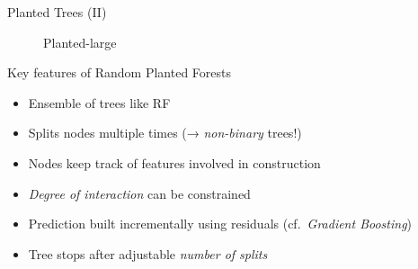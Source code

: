 \documentclass[aspectratio=169,12pt]{beamer}
\providecommand{\tightlist}{%
  \setlength{\itemsep}{2pt}\setlength{\parskip}{0pt}}
\begin{document}
\begin{frame}{Planted Trees (II)}
\label{planted-trees-ii}
\begin{figure}


\caption{\label{fig-planted}Planted-large}

\end{figure}%
\end{frame}

\begin{frame}{Key features of Random Planted Forests}
\label{key-features-of-random-planted-forests}
\begin{itemize}[<+->]
\tightlist
\item
  Ensemble of trees like RF
\item
  Splits nodes multiple times (→ \emph{non-binary} trees!)
\item
  Nodes keep track of features involved in construction
\item
  \emph{Degree of interaction} can be constrained
\item
  Prediction built incrementally using residuals (cf.~\emph{Gradient
  Boosting})
\item
  Tree stops after adjustable \emph{number of splits}
\end{itemize}
\end{frame}
\end{document}
